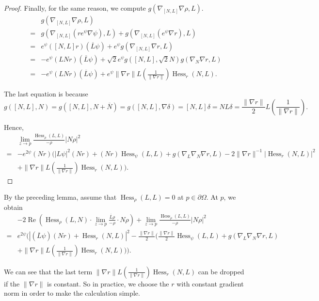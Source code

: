 \documentclass[11pt]{article}
\theoremstyle{plain} \numberwithin{equation}{section}
\theoremstyle{definition}
\DeclareMathOperator{\Hessian}{Hess}
\renewcommand{\Re}{\operatorname{Re}}
\begin{document}
\begin{proof}
		Finally, for the same reason, we compute $g(\nabla_{[N, L]}\nabla\rho, L)$.	
		\[\begin{split}
		&g(\nabla_{[N, L]}\nabla\rho, L)\\=&g(\nabla_{[N, L]}(r e^\psi\nabla\psi), L)+g(\nabla_{[N, L]}(e^\psi\nabla r), L)\\=&e^\psi([N, L]r)(\overline{L}\psi)+e^\psi g(\nabla_{[N, L]}\nabla r, L)\\=&-e^\psi(LNr)(\overline{L}\psi)+\sqrt{2}e^\psi g([N, L], \sqrt{2}N)g(\nabla_N\nabla r, L)\\=&-e^\psi(LNr)(\overline{L}\psi)+e^\psi\|\nabla r\|L\left(\frac{1}{\|\nabla r\|}\right)\Hessian_r(N, L).
		\end{split}\]
		
		The last equation is because  \[g([N, L], N)=g([N, L], N+\overline{N})=g([N, L], \nabla\delta)= [N, L]\delta=NL\delta=\frac{\|\nabla r\|}{2}L\left(\frac{1}{\|\nabla r\|}\right).\] 
		
		Hence, 	\[\begin{split}
		&\lim\limits_{z\to p}\frac{\Hessian_{\rho} (L, L)}{-\rho}\left|N\rho\right|^2\\=&-e^{2\psi}(Nr)\Bigg(|L\psi|^2(Nr)+(Nr)\Hessian_\psi(L, L)+ g(\nabla_L\nabla_N\nabla r, L)-2\|\nabla r\|^{-1}|\Hessian_r(N, L)|^2\\&+\|\nabla r\|L\left(\frac{1}{\|\nabla r\|}\right)\Hessian_r(N, L)\Bigg).
		\end{split}\]
	\end{proof}
	
	By the preceding lemma, assume that $\Hessian_\rho(L, L)=0$ at $p\in \partial\Omega$. At $p$, we obtain	
	\[\begin{split}
		&-2\Re\left(\Hessian_{\rho} (L, N)\cdot\lim\limits_{z\to p}\frac{\overline{L}\rho}{-\rho}\cdot N\rho\right)+\lim\limits_{z\to p}\frac{\Hessian_{\rho} (L, L)}{-\rho}\left|N\rho\right|^2\\=&e^{2\psi}\Bigg(|(\overline{L}\psi)(Nr)+\Hessian_r(N, L)|^2-\frac{\|\nabla r\|}{2}\Big(\frac{\|\nabla r\|}{2}\Hessian_\psi(L, L)+g(\nabla_L\nabla_N\nabla r, L)\\&+\|\nabla r\|L\left(\frac{1}{\|\nabla r\|}\right)\Hessian_r(N, L)\Big)\Bigg).
	\end{split}
	\]
	
	We can see that the last term $\|\nabla r\|L\left(\frac{1}{\|\nabla r\|}\right)\Hessian_r(N, L)$ can be dropped if the $\|\nabla r\|$ is constant. So in practice, we choose the $r$ with constant gradient norm in order to make the calculation simple.
\end{document}

